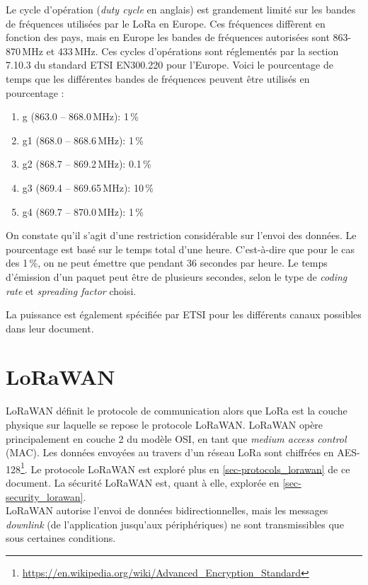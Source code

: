 Le cycle d'opération (\textit{duty cycle} en anglais) est grandement limité sur les bandes de fréquences utilisées par le LoRa en Europe. Ces fréquences diffèrent en fonction des pays, mais en Europe les bandes de fréquences autorisées sont 863-870\,MHz et 433\,MHz. Ces cycles d'opérations sont réglementés par la section 7.10.3 du standard ETSI EN300.220 \cite{EN30022033:online} pour l'Europe. Voici le pourcentage de temps que les différentes bandes de fréquences peuvent être utilisés en pourcentage : 
\begin{enumerate}
    \item g (863.0 – 868.0\,MHz): 1\,\%
    \item g1 (868.0 – 868.6\,MHz): 1\,\%
    \item g2 (868.7 – 869.2\,MHz): 0.1\,\%
    \item g3 (869.4 – 869.65\,MHz): 10\,\%
    \item g4 (869.7 – 870.0\,MHz): 1\,\%
\end{enumerate}

On constate qu'il s'agit d'une restriction considérable sur l'envoi des données. Le pourcentage est basé sur le temps total d'une heure. C'est-à-dire que pour le cas des 1\,\%, on ne peut émettre que pendant 36 secondes par heure. Le temps d'émission d'un paquet peut être de plusieurs secondes, selon le type de \textit{coding rate} et \textit{spreading factor} choisi.


La puissance est également spécifiée par ETSI pour les différents canaux possibles dans leur document.


\section{LoRaWAN}

LoRaWAN définit le protocole de communication alors que LoRa est la couche physique sur laquelle se repose le protocole LoRaWAN. LoRaWAN opère principalement en couche 2 du modèle OSI, en tant que \textit{medium access control} (MAC). Les données envoyées au travers d'un réseau LoRa sont chiffrées en AES-128\footnote{\url{https://en.wikipedia.org/wiki/Advanced_Encryption_Standard}}. Le protocole LoRaWAN est exploré plus en \cref{sec-protocols_lorawan} de ce document. La sécurité LoRaWAN est, quant à elle, explorée en \cref{sec-security_lorawan}.\\

LoRaWAN autorise l'envoi de données bidirectionnelles, mais les messages \textit{downlink} (de l'application jusqu'aux périphériques) ne sont transmissibles que sous certaines conditions.

